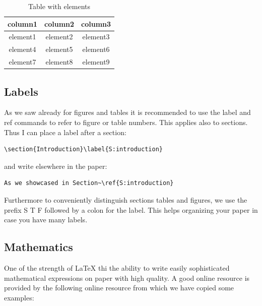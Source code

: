 \begin{table}[htb]
\caption{Table with elements}\label{T:elements}
\bigskip
\begin{center}
\begin{tabular}{ c c c }
 column1  & column2  & column3 \\
\toprule
 element1 & element2 & element3 \\ 
 element4 & element5 & element6 \\  
 element7 & element8 & element9 \\
\bottomrule
\end{tabular}
\end{center}
\end{table}

\subsection{Labels}\label{labels}

As we saw already for figures and tables it is recommended to use the
label and ref commands to refer to figure or table numbers. This applies
also to sections. Thus I can place a label after a section:

\begin{verbatim}
\section{Introduction}\label{S:introduction}
\end{verbatim}

and write elsewhere in the paper:

\begin{verbatim}
As we showcased in Section~\ref{S:introduction}
\end{verbatim}

Furthermore to conveniently distinguish sections tables and figures, we
use the prefix S T F followed by a colon for the label. This helps
organizing your paper in case you have many labels.

\subsection{Mathematics}\label{math}

One of the strength of LaTeX thi the ability to write easily
sophisticated mathematical expressions on paper with high quality. A
good online resource is provided by the following online resource from
which we have copied some examples:

